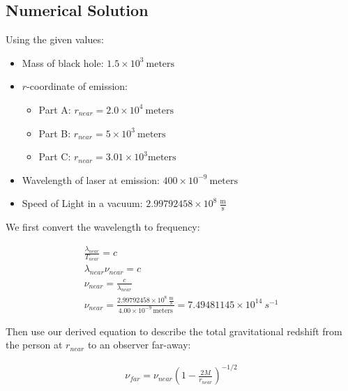 \documentclass[]{report}
\begin{document}
      \subsection{Numerical Solution}
        Using the given values:
        \begin{itemize}
          \item Mass of black hole: $1.5\times10^3\ \text{meters}$
          \item $r$-coordinate of emission:
            \begin{itemize}
              \item Part A: $r_{near}=2.0\times10^4\ \text{meters}$
              \item Part B: $r_{near}=5\times10^3\ \text{meters}$
              \item Part C: $r_{near}=3.01\times10^3 \text{meters}$
              \end{itemize}
          \item Wavelength of laser at emission: $400\times10^{-9}\ \text{meters}$
          \item Speed of Light in a vacuum: $2.99792458\times10^8\ \frac{\text{m}}{\text{s}}$
          \end{itemize}

        We first convert the wavelength to frequency:

        \begin{equation*}
          \begin{split}
            \frac{\lambda_{near}}{T_{near}}=c\\
            \lambda_{near}\nu_{near}=c \\
            \nu_{near} = \frac{c}{\lambda_{near}} \\
            \nu_{near} = \frac{2.99792458\times10^8\ \frac{\text{m}}{\text{s}}}{4.00\times10^{-9}\ \text{meters}} = 7.49481145\times10^{14}\ s^{-1}
            \end{split}
          \end{equation*}

        Then use our derived equation to describe the total gravitational redshift from the person at $r_{near}$ to an observer far-away:

        \begin{equation*}
          \begin{split}
            \nu_{far} = \nu_{near}\left(1 - \frac{2M}{r_{near}} \right)^{-1/2}
            \end{split}
          \end{equation*}
\end{document}
